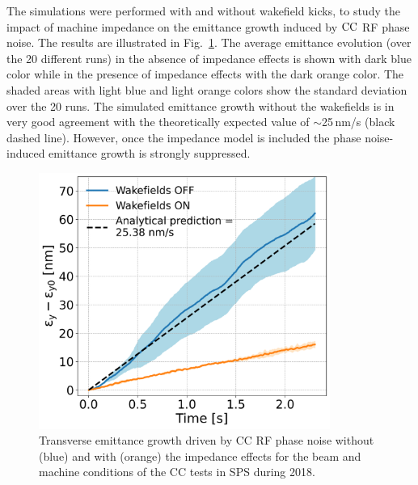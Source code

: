 The simulations were performed with and without wakefield kicks, to study the impact of machine impedance on the emittance growth induced by ${\mathrm{CC}}$ RF phase noise. The results are illustrated in Fig.~\ref{fig:MD_2018_impedance_simulations}. The average emittance evolution (over the 20 different runs) in the absence of impedance effects is shown with dark blue color while in the presence of impedance effects with the dark orange color. The shaded areas with light blue and light orange colors show the standard deviation over the 20 runs. The simulated emittance growth without the wakefields is in very good agreement with the theoretically expected value of $\sim$25\,nm/s (black dashed line). However, once the impedance model is included the phase noise-induced emittance growth is strongly suppressed.

\begin{figure}[!h] 
    \centering         
    \includegraphics[width=0.85\textwidth]{images/Ch7/sps_270GeV_PN1e-8_400MHz_SPS_NewWakesAllcontributions_appendWakes_y-plane_WakesOFF_QpxQpy5e-1_6D_Nb5e5_intensity3e10_wakesONvsOFF_emittance_evolution.png}
        \caption{Transverse emittance growth driven by CC RF phase noise without (blue) and with (orange) the impedance effects for the beam and machine conditions of the CC tests in SPS during 2018.}
        \label{fig:MD_2018_impedance_simulations}
 \end{figure}

